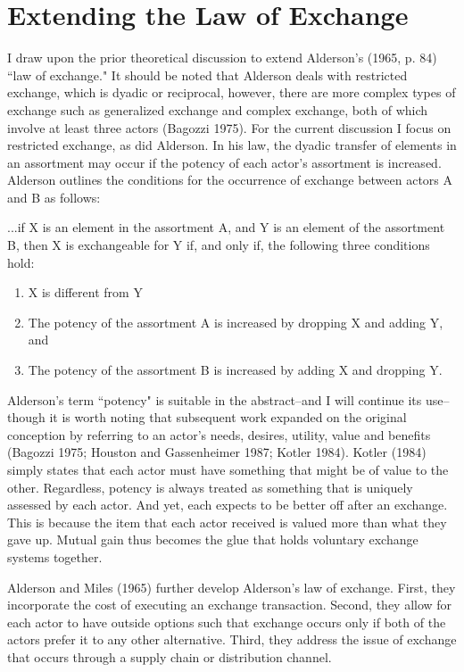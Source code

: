 \section{Extending the Law of Exchange}
I draw upon the prior theoretical discussion to extend Alderson's (1965, p. 84) ``law of exchange." It should be noted that Alderson deals with restricted exchange, which is dyadic or reciprocal, however, there are more complex types of exchange such as generalized exchange and complex exchange, both of which involve at least three actors (Bagozzi 1975). For the current discussion I focus on restricted exchange, as did Alderson.  In his law, the dyadic transfer of elements in an assortment may occur if the potency of each actor's assortment is increased. Alderson outlines the conditions for the occurrence of exchange between actors A and B as follows:

\begin{small}
...if X is an element in the assortment A, and Y is an element of the assortment B, then X is exchangeable for Y if, and only if, the following three conditions hold:
\begin{enumerate}
  \item X is different from Y
  \item The potency of the assortment A is increased by dropping X and adding Y, and
  \item The potency of the assortment B is increased by adding X and dropping Y.
\end{enumerate}
\end{small}

Alderson's term ``potency" is suitable in the abstract--and I will continue its use--though it is worth noting that subsequent work expanded on the original conception by referring to an actor's needs, desires, utility, value and benefits (Bagozzi 1975; Houston and Gassenheimer 1987; Kotler 1984). Kotler (1984) simply states that each actor must have something that might be of value to the other. Regardless, potency is always treated as something that is uniquely assessed by each actor. And yet, each expects to be better off after an exchange. This is because the item that each actor received is valued more than what they gave up. Mutual gain thus becomes the glue that holds voluntary exchange systems together. 

Alderson and Miles (1965) further develop Alderson's law of exchange. First, they incorporate the cost of executing an exchange transaction. Second, they allow for each actor to have outside options such that exchange occurs only if both of the actors prefer it to any other alternative. Third, they address the issue of exchange that occurs through a supply chain or distribution channel. 


